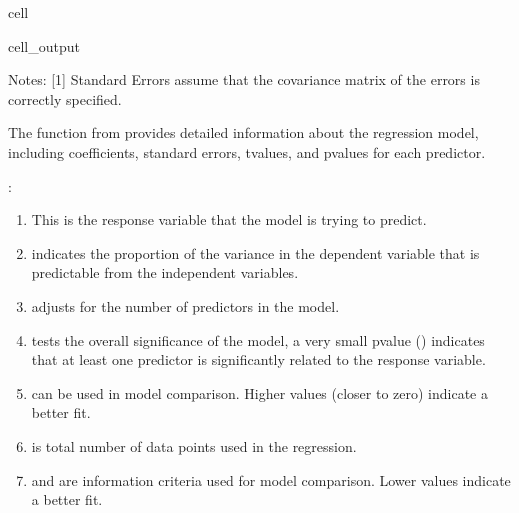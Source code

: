 \documentclass[letterpaper,10pt,english]{jupyterBook}
\begin{document}
\begin{sphinxuseclass}{cell}
\begin{sphinxVerbatimOutput}
\begin{sphinxuseclass}{cell_output}
\begin{sphinxVerbatim}[commandchars=\\\{\}]
Notes:
[1] Standard Errors assume that the covariance matrix of the errors is correctly specified.
\end{sphinxVerbatim}

\end{sphinxuseclass}\end{sphinxVerbatimOutput}

\end{sphinxuseclass}
\sphinxAtStartPar
The  function from  provides detailed information about the regression model, including coefficients, standard errors, t\sphinxhyphen{}values, and p\sphinxhyphen{}values for each predictor.

\sphinxAtStartPar
{}:
\begin{enumerate}
%
\item {} 
\sphinxAtStartPar
{} This is the response variable that the model is trying to predict.

\item {} 
\sphinxAtStartPar
{} indicates the proportion of the variance in the dependent variable that is predictable from the independent variables.

\item {} 
\sphinxAtStartPar
{} adjusts for the number of predictors in the model.

\item {} 
\sphinxAtStartPar
{} tests the overall significance of the model, a very small p\sphinxhyphen{}value () indicates that at least one predictor is significantly related to the response variable.

\item {} 
\sphinxAtStartPar
{} can be used in model comparison. Higher values (closer to zero) indicate a better fit.

\item {} 
\sphinxAtStartPar
{} is total number of data points used in the regression.

\item {} 
\sphinxAtStartPar
{} and  are information criteria used for model comparison. Lower values indicate a better fit.


\end{enumerate}
\end{document}
